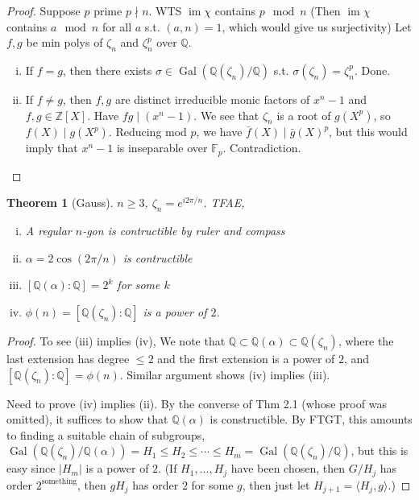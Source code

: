 \documentclass{article}
\theoremstyle{definition}
\theoremstyle{remark}
\theoremstyle{plain}
\newtheorem{thm}[defn]{Theorem}
\newcommand{\ZZ}{\mathbb{Z}}
\newcommand{\QQ}{\mathbb{Q}}
\newcommand{\FF}{\mathbb{F}}
\newcommand{\Gal}{\operatorname{Gal}}
\begin{document}
\begin{proof}
    Suppose $p$ prime $p\nmid n$. WTS $\operatorname{im}\chi$ contains $p\mod n$ (Then $\operatorname{im}\chi$ contains $a\mod n$ for all $a$ s.t. $(a,n)=1$, which would give us surjectivity)
    Let $f,g$ be min polys of $\zeta_n$ and $\zeta_n^p$ over $\QQ$.
    \begin{enumerate}[(i)]
        \item If $f=g$, then there exists $\sigma\in\Gal(\QQ(\zeta_n)/\QQ)$ s.t. $\sigma(\zeta_n)=\zeta_n^p$. Done.
        \item If $f\neq g$, then $f,g$ are distinct irreducible monic factors of $x^n-1$ and $f,g\in\ZZ[X]$. Have $fg\mid (x^n-1)$. We see that $\zeta_n$ is a root of $g(X^p)$, so $f(X)\mid g(X^p)$. Reducing mod $p$, we have $\bar f(X)\mid \bar g(X)^p$, but this would imply that $x^n-1$ is inseparable over $\FF_p$. Contradiction.
    \end{enumerate}
\end{proof}
\begin{thm}[Gauss]
    $n\ge 3$, $\zeta_n=e^{i2\pi /n}$. TFAE,
    \begin{enumerate}[(i)]
        \item A regular $n$-gon is contructible by ruler and compass
        \item $\alpha=2\cos(2\pi/n)$ is contructible
        \item $[\QQ(\alpha):\QQ]=2^k$ for some $k$
        \item $\phi(n)=[\QQ(\zeta_n):\QQ]$ is a power of $2$.
    \end{enumerate}
\end{thm}
\begin{proof}
    To see (iii) implies (iv), We note that $\QQ\subset\QQ(\alpha)\subset\QQ(\zeta_n)$, where the last extension has degree $\le 2$ and the first extension is a power of $2$, and $[\QQ(\zeta_n):\QQ]=\phi(n)$.
    Similar argument shows (iv) implies (iii).

    Need to prove (iv) implies (ii). By the converse of Thm 2.1 (whose proof was omitted), it suffices to show that $\QQ(\alpha)$ is constructible. By FTGT, this amounts to finding a suitable chain of subgroups, $\Gal(\QQ(\zeta_n)/\QQ(\alpha))=H_1\le H_2\le \cdots\le H_m=\Gal(\QQ(\zeta_n)/\QQ)$, but this is easy since $|H_m|$ is a power of $2$. (If $H_1,...,H_j$ have been chosen, then $G/H_j$ has order $2^\text{something}$, then $gH_j$ has order $2$ for some $g$, then just let $H_{j+1}=\langle H_j,g\rangle$.)
\end{proof}
\end{document}
